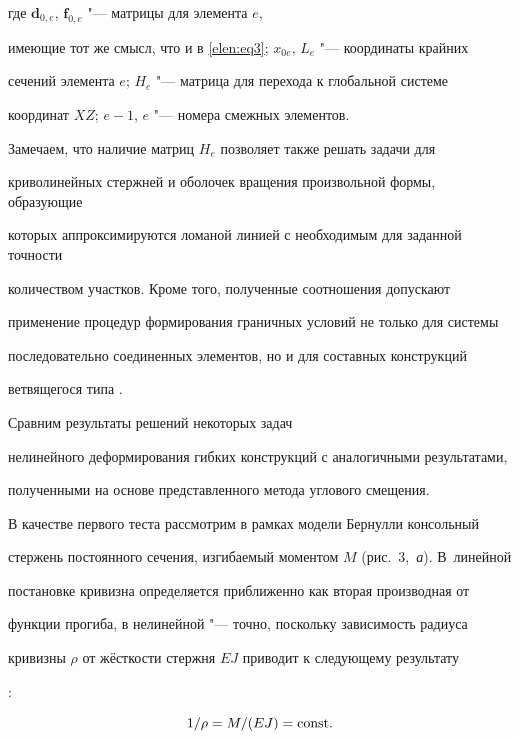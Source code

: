 где $\textbf{d}_{0,e}$, $\textbf{f}_{0,e}$ "--- матрицы для элемента $e$,

имеющие тот же смысл, что и в \eqref{elen:eq3}; $x_{0e}$, $L_e$ "--- координаты крайних

сечений элемента $e$; $H_e$ "--- матрица для перехода к глобальной системе

координат $XZ$; $e-1$, $e$ "--- номера смежных элементов.



Замечаем, что наличие матриц $H_e$ позволяет также решать задачи для

криволинейных стержней и оболочек вращения произвольной формы, образующие

которых аппроксимируются ломаной линией с необходимым для заданной точности

количеством участков. Кроме того, полученные соотношения допускают

применение процедур формирования граничных условий не только для системы

последовательно соединенных элементов, но и для составных конструкций

ветвящегося типа \cite{elen:bib5}.



\smallskip



 Сравним результаты решений некоторых задач

нелинейного деформирования гибких конструкций с аналогичными результатами,

полученными на основе представленного метода углового смещения.



В качестве первого теста рассмотрим в рамках модели Бернулли консольный

стержень постоянного сечения, изгибаемый моментом $M$ (рис.~3,~{\sl а}). В~линейной

постановке кривизна определяется приближенно как вторая производная от

функции прогиба, в нелинейной "--- точно, поскольку зависимость радиуса

кривизны $\rho $ от жёсткости стержня $EJ$ приводит к следующему результату

\cite{elen:bib6}:

\begin{equation}

\label{elen:eq18}

 1/\rho =M/(EJ)={\rm const}.

\end{equation}



